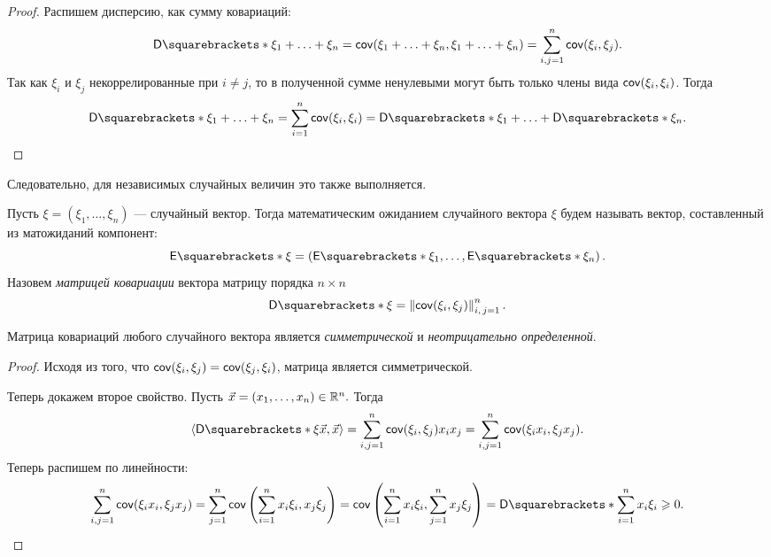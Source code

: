 \begin{proof}
	Распишем дисперсию, как сумму ковариаций:
	\[
	\D{\xi_1 + \ldots + \xi_n} = \cov(\xi_1 + \ldots + \xi_n, \xi_1 + \ldots + \xi_n) = \sum\limits_{i, j = 1}^{n}\cov(\xi_i, \xi_j).
	\]
	Так как \(\xi_i\) и \(\xi_j\) некоррелированные при \(i \neq j\), то в полученной сумме ненулевыми могут быть только члены вида \(\operatorname{\mathsf{cov}}(\xi_i, \xi_i)\). Тогда
	\[
	\D{\xi_1 + \ldots + \xi_n} = \sum\limits_{i = 1}^{n}\cov(\xi_i, \xi_i) = \D{\xi_1} + \ldots + \D{\xi_n}.\qedhere
	\]
\end{proof}
Следовательно, для независимых случайных величин это также выполняется.
		
\begin{definition}
	Пусть \(\xi = (\xi_1,\ldots,\xi_n)\) --- случайный вектор. Тогда математическим ожиданием случайного вектора \(\xi\) будем называть вектор, составленный из матожиданий компонент: \[\E{\xi} = \left(\E{\xi_1}, \ldots, \E{\xi_n} \right). \] Назовем \emph{матрицей ковариации} вектора матрицу порядка \(n \times n\) 
	\[
	\D{\xi} = \left\lVert\cov(\xi_i, \xi_j)\right\rVert_{i,\,j = 1}^{n}.
	\]
\end{definition}
		
\begin{point}
	Матрица ковариаций любого случайного вектора является \emph{симметрической} и \emph{неотрицательно определенной}.
\end{point}
\begin{proof}
	Исходя из того, что \(\operatorname{\mathsf{cov}}(\xi_i, \xi_j) = \operatorname{\mathsf{cov}}(\xi_j, \xi_i) \), матрица является симметрической.
	
	Теперь докажем второе свойство. Пусть \(\vec{x} = (x_1,\ldots,x_n) \in \mathbb{R}^n. \) Тогда \[\langle\D{\xi}\vec{x}, \vec{x}\rangle = \sum\limits_{i, j = 1}^{n}\cov(\xi_i, \xi_j)x_ix_j = \sum\limits_{i, j = 1}^{n}\cov(\xi_ix_i, \xi_jx_j).  \] Теперь распишем по линейности:
	\[\sum\limits_{i, j = 1}^{n} \cov(\xi_{i}x_{i}, \xi_{j}x_{j}) = \sum\limits_{j = 1}^{n} \cov\left(\sum\limits_{i = 1}^{n} x_{i}\xi_{i}, x_{j}\xi_{j}\right) = \cov\left(\sum\limits_{i=1}^{n}x_i\xi_i,\sum\limits_{j=1}^{n} x_j\xi_j\right) = \D{\sum\limits_{i=1}^{n}x_i\xi_i} \geq 0. \]
\end{proof}